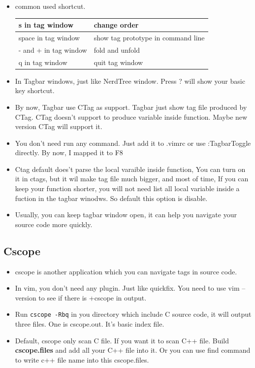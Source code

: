 \documentclass[a4paper,12pt,twoside]{book}
\begin{document}
\begin{itemize}
\begin{itemize}
\item common used shortcut.	\\	
\begin{tabular}{|p{}|p{}|}
\hline 
s in tag window & change order \\ 
\hline 
space in tag window & show tag prototype in command line  \\ 
\hline 
- and + in tag window & fold and unfold \\ 
\hline 
q in tag window & quit tag window \\ 
\hline 
\end{tabular}
\item In Tagbar windows, just like NerdTree window. Press ? will show your basic key shortcut. 
\item By now, Tagbar use CTag as support. Tagbar just show tag file produced by CTag. CTag doesn't support to produce variable inside function. Maybe new version CTag will support it. 
\item You don't need run any command. Just add it to .vimrc or use :TagbarToggle directly. By now, I mapped it to F8
\item Ctag default does't parse the local varaible inside function, You can turn on it in ctags, but it wil make tag file much bigger, and most of time, If you can keep your function shorter, you will not need list all local variable inside a fuction in the tagbar winodws. So default this option is disable. 
\item Usually, you can keep tagbar window open, it can help you navigate your source code more quickly. 
\end{itemize}

\subsection{Cscope}
\begin{itemize}

\item cscope is another application which you can navigate tags in source code. 
\item In vim, you don't need any plugin. Just like quickfix. You need to use vim --version to see if there is +cscope in output. 

\item Run \verb=cscope -Rbq= in you directory which include C source code, it will output three files. One is cscope.out. It's basic index file. 

\item Default, cscope only scan C file. If you want it to scan C++ file. Build \textbf{cscope.files} and add all your C++ file into it. Or you can use find command to write c++ file name into this cscope.files.


\end{itemize}
\end{itemize}
\end{document}
